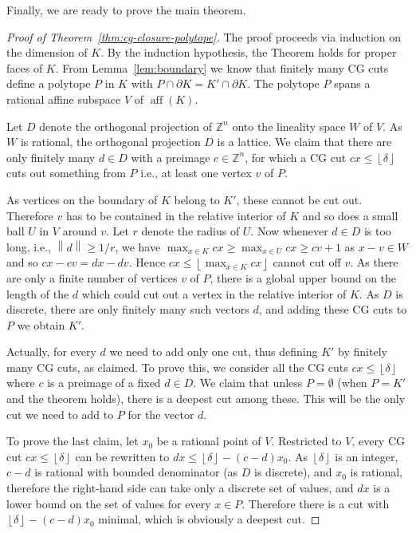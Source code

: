 \documentclass[11pt]{article}
\theoremstyle{remark}
\begin{document}
Finally, we are ready to prove the main theorem.
\begin{proof}[Proof of Theorem~\ref{thm:cg-closure-polytope}]
The proof proceeds via induction on the dimension of \(K\).
By the induction hypothesis, the Theorem holds
for proper faces of \(K\).
From Lemma~\ref{lem:boundary} we know that
finitely many {CG\xspace} cuts define a polytope \(P\) in \(K\)
with \(P \cap \partial K = K' \cap \partial K\).
The polytope \(P\) spans
a rational affine subspace \(V\) of \({\operatorname{aff}({K})}\).

Let \(D\) denote the orthogonal projection
of \({\mathbb{Z}}^{n}\) onto the lineality space \(W\) of \(V\).
As \(W\) is rational, the orthogonal projection \(D\)
is a lattice.
We claim that there are only finitely many \(d \in D\)
with a preimage \(c \in {\mathbb{Z}}^{n}\),
for which a {CG\xspace} cut \(c x \leq {\left\lfloor{\delta}\right\rfloor}\)
cuts out something from \(P\)
i.e., at least one vertex \(v\) of \(P\).

As vertices on the boundary of \(K\) belong to \(K'\),
these cannot be cut out. Therefore \(v\) has to be contained in the relative interior of
\(K\) and so does a small ball \(U\) in \(V\) around \(v\).
Let \(r\) denote the radius of \(U\).
Now whenever \(d \in D\) is too long, i.e., \({\left\lVert{d}\right\rVert} \geq 1/r\),
we have \(\max_{x \in K} c x \geq \max_{x \in U} cx \geq cv + 1\) as
\(x-v \in W\) and so \(cx-cv = dx - dv\). Hence \(cx \leq {\left\lfloor{\max_{x
  \in K} cx}\right\rfloor}\) cannot cut off \(v\). As there are only a finite number
of vertices \(v\) of \(P\),
there is a global upper bound on the length of the \(d\)
which could cut out a vertex in the relative interior of \(K\).
As \(D\) is discrete, there are only finitely many such vectors \(d\),
and adding these {CG\xspace} cuts to \(P\) we obtain \(K'\).

Actually, for every \(d\) we need to add only one cut,
thus defining \(K'\) by finitely many {CG\xspace} cuts, as claimed.
To prove this,
we consider all the {CG\xspace} cuts \(c x \leq {\left\lfloor{\delta}\right\rfloor}\)
where \(c\) is a preimage of a fixed \(d \in D\).
We claim that unless \(P = \emptyset\) 
(when \(P = K'\) and the theorem holds),
there is a deepest cut among these.
This will be the only cut
we need to add to \(P\) for the vector \(d\).

To prove the last claim, let \(x_{0}\) be a rational point of \(V\).
Restricted to \(V\), every {CG\xspace} cut \(c x \leq {\left\lfloor{\delta}\right\rfloor}\)
can be rewritten to \(d x \leq {\left\lfloor{\delta}\right\rfloor} - (c - d) x_{0}\).
As \({\left\lfloor{\delta}\right\rfloor}\) is an integer,
\(c - d\) is rational with bounded denominator
(as \(D\) is discrete),
and \(x_{0}\) is rational,
therefore
the right-hand side can take only a discrete set of values,
and \(d x\) is a lower bound on the set of values for every
\(x \in P\).
Therefore there is a cut with \({\left\lfloor{\delta}\right\rfloor} - (c - d) x_{0}\)
minimal, which is obviously a deepest cut.
\end{proof}
\end{document}
